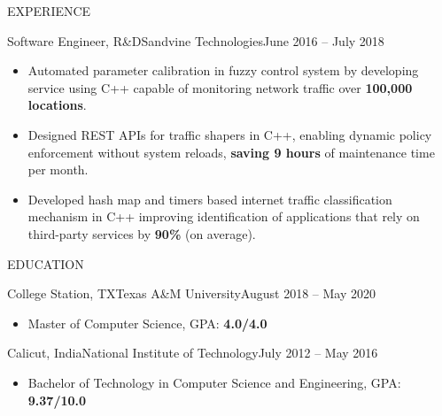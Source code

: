 \documentclass[]{mcdowellcv}
\begin{document}
\begin{cvsection}{EXPERIENCE}
		\begin{cvsubsection}{Software Engineer, R\&D}{Sandvine Technologies}{June 2016 -- July 2018}
			\begin{itemize}
				\item Automated parameter calibration in fuzzy control system by developing service using C++ capable of monitoring network traffic over \textbf{100,000 locations}.
				\item Designed REST APIs for traffic shapers in C++, enabling dynamic policy enforcement without system reloads, \textbf{saving 9 hours} of maintenance time per month.
				\item Developed hash map and timers based internet traffic classification mechanism in C++ improving identification of applications that rely on third-party services by \textbf{90\%} (on average).
			\end{itemize}
		\end{cvsubsection}
	\end{cvsection}

	\begin{cvsection}{EDUCATION}
		\begin{cvsubsection}{College Station, TX}{Texas A\&M University}{August 2018 -- May 2020}
			\begin{itemize}
				\item Master of Computer Science, GPA: \textbf{4.0/4.0}
			\end{itemize}
		\end{cvsubsection}
		
		\begin{cvsubsection}{Calicut, India}{National Institute of Technology}{July 2012 -- May 2016}
			\begin{itemize}
				\item Bachelor of Technology in Computer Science and Engineering, GPA: \textbf{9.37/10.0}
			\end{itemize}
		\end{cvsubsection}
	\end{cvsection}
\end{document}
